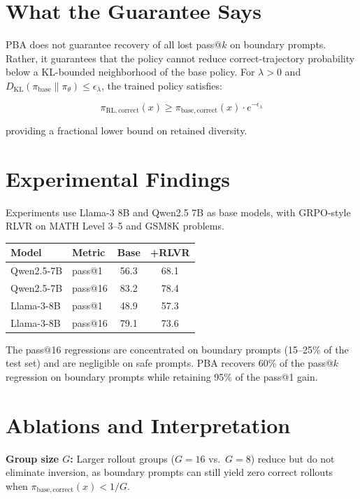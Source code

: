 \documentclass[10pt,twocolumn]{article}
\begin{document}
\section{What the Guarantee Says}

PBA does not guarantee recovery of all lost pass@$k$ on boundary prompts.
Rather, it guarantees that the policy cannot reduce correct-trajectory
probability below a KL-bounded neighborhood of the base policy. For
$\lambda > 0$ and $D_\mathrm{KL}(\pi_\mathrm{base} \| \pi_\theta) \leq \epsilon_\lambda$,
the trained policy satisfies:

\[
\pi_\mathrm{RL,correct}(x)
  \geq \pi_\mathrm{base,correct}(x) \cdot e^{-\epsilon_\lambda}
\]

providing a fractional lower bound on retained diversity.

\section{Experimental Findings}

Experiments use Llama-3 8B and Qwen2.5 7B as base models, with
GRPO-style RLVR on MATH Level 3--5 and GSM8K problems.

\begin{center}
\small
\begin{tabular}{llcc}
\toprule
Model & Metric & Base & +RLVR \\
\midrule
Qwen2.5-7B & pass@1 & 56.3 & 68.1 \\
Qwen2.5-7B & pass@16 & 83.2 & 78.4 \\
Llama-3-8B & pass@1 & 48.9 & 57.3 \\
Llama-3-8B & pass@16 & 79.1 & 73.6 \\
\bottomrule
\end{tabular}
\end{center}

The pass@16 regressions are concentrated on boundary prompts
(15--25\% of the test set) and are negligible on safe prompts.
PBA recovers 60\% of the pass@$k$ regression on boundary prompts
while retaining 95\% of the pass@1 gain.

\section{Ablations and Interpretation}

\textbf{Group size $G$:} Larger rollout groups ($G = 16$ vs.\ $G = 8$)
reduce but do not eliminate inversion, as boundary prompts can still
yield zero correct rollouts when $\pi_\mathrm{base,correct}(x) < 1/G$.
\end{document}
